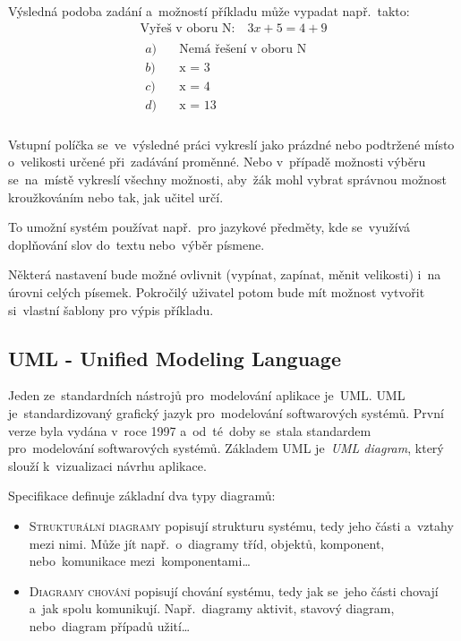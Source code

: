 \documentclass[14pt,a4paper]{article}
\begin{document}
        Výsledná podoba zadání a~možností příkladu může vypadat např.~takto:
        \begin{align*}
            \text{Vyřeš v oboru N:} \quad 3x + 5 = 4 + 9 \\
            \begin{aligned}
                a) \quad &\text{Nemá řešení v oboru N} \\
                b) \quad &\text{x = 3} \\
                c) \quad &\text{x = 4} \\
                d) \quad &\text{x = 13} \\
            \end{aligned}
        \end{align*}

        Vstupní políčka se~ve~výsledné práci vykreslí jako prázdné nebo podtržené místo o~velikosti určené při~zadávání proměnné. Nebo v~případě možnosti výběru se~na~místě vykreslí všechny možnosti, aby~žák mohl vybrat správnou možnost kroužkováním nebo tak, jak učitel určí.
        
        To umožní systém používat např.~pro jazykové předměty, kde se~využívá doplňování slov do~textu nebo~výběr písmene.

        Některá nastavení bude možné ovlivnit (vypínat, zapínat, měnit velikosti) i~na úrovni celých písemek. Pokročilý uživatel potom bude mít možnost vytvořit si~vlastní šablony pro výpis příkladu.

        \subsection{UML - Unified Modeling Language}
        Jeden ze~standardních nástrojů pro~modelování aplikace je~\textsc{UML}. \textsc{UML} je~standardizovaný grafický jazyk pro~modelování softwarových systémů. První verze byla vydána v~roce 1997 a~od~té~doby se~stala standardem pro~modelování softwarových systémů.
        Základem \textsc{UML} je~\emph{UML diagram}, který slouží k~vizualizaci návrhu aplikace. \cite{uml:diagram}
        
        Specifikace definuje základní dva typy diagramů:
        \begin{itemize}
            \item \textsc{Strukturální diagramy} popisují strukturu systému, tedy jeho části a~vztahy mezi nimi. Může jít např.~o~diagramy tříd, objektů, komponent, nebo~komunikace mezi~komponentami\dots
            \item \textsc{Diagramy chování} popisují chování systému, tedy jak se~jeho části chovají a~jak spolu komunikují. Např.~diagramy aktivit, stavový diagram, nebo~diagram případů užití\dots
        \end{itemize}
\end{document}
